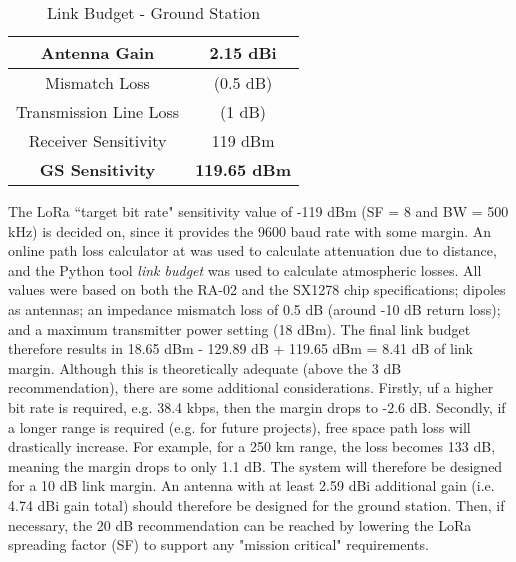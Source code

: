 \begin{table}[!htb]
  \centering
  \renewcommand{\arraystretch}{1.2}
  \begin{tabular}{ |c|c| }
  \hline
  Antenna Gain                  & 2.15 dBi                \\ \hline
  Mismatch Loss                 & (0.5 dB)                \\ \hline
  Transmission Line Loss        & (1 dB)                  \\ \hline
  Receiver Sensitivity          & 119 dBm                 \\ \hline
  \textbf{GS Sensitivity}       & \textbf{119.65 dBm}     \\ \hline
  \end{tabular}
  \caption{Link Budget - Ground Station}
  \label{tab:link_budget_gs}
\end{table}

The LoRa ``target bit rate" sensitivity value of -119 dBm (SF = 8 and BW = 500 kHz) is decided on, since it provides the 9600 baud rate with some margin.  An online path loss calculator at \cite{site-pathLossCalculator} was used to calculate attenuation due to distance, and the Python tool \textit{link budget} was used to calculate atmospheric losses. All values were based on both the RA-02 and the SX1278 chip specifications; dipoles as antennas; an impedance mismatch loss of 0.5 dB (around -10 dB return loss); and a maximum transmitter power setting (18 dBm). The final link budget therefore results in 18.65 dBm - 129.89 dB + 119.65 dBm = 8.41 dB of link margin. Although this is theoretically adequate (above the 3 dB recommendation), there are some additional considerations. Firstly, uf a higher bit rate is required, e.g. 38.4 kbps, then the margin drops to -2.6 dB. Secondly, if a longer range is required (e.g. for future projects), free space path loss will drastically increase. For example, for a 250 km range, the loss becomes 133 dB, meaning the margin drops to only 1.1 dB. The system will therefore be designed for a 10 dB link margin. An antenna with at least 2.59 dBi additional gain (i.e. 4.74 dBi gain total) should therefore be designed for the ground station. Then, if necessary, the 20 dB recommendation can be reached by lowering the LoRa spreading factor (SF) to support any "mission critical" requirements.